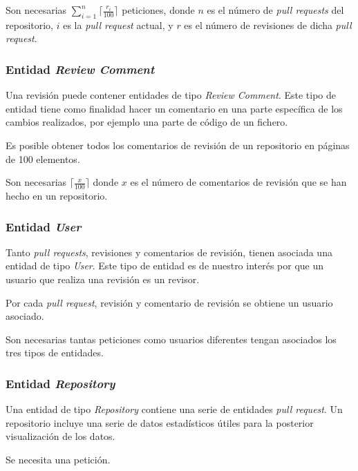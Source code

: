 
Son necesarias $\sum_{i=1}^{n}\lceil\frac{r_{i}}{100}\rceil$ peticiones, donde $n$ es el número de \textit{pull requests} del repositorio, $i$ es la \textit{pull request} actual, y $r$ es el número de revisiones de dicha \textit{pull request}.

\subsubsection{Entidad \textit{Review Comment}}

Una revisión puede contener entidades de tipo \textit{Review Comment}. Este tipo de entidad tiene como finalidad hacer un comentario en una parte específica de los cambios realizados, por ejemplo una parte de código de un fichero.

Es posible obtener todos los comentarios de revisión de un repositorio en páginas de 100 elementos.


Son necesarias $\lceil\frac{x}{100}\rceil$ donde $x$ es el número de comentarios de revisión que se han hecho en un repositorio.

\subsubsection{Entidad \textit{User}}

Tanto \textit{pull requests}, revisiones y comentarios de revisión, tienen asociada una entidad de tipo \textit{User}. Este tipo de entidad es de nuestro interés por que un usuario que realiza una revisión es un revisor.

Por cada \textit{pull request}, revisión y comentario de revisión se obtiene un usuario asociado.

Son necesarias tantas peticiones como usuarios diferentes tengan asociados los tres tipos de entidades.

\subsubsection{Entidad \textit{Repository}}

Una entidad de tipo \textit{Repository} contiene una serie de entidades \textit{pull request}. Un repositorio incluye una serie de datos estadísticos útiles para la posterior visualización de los datos.

Se necesita una petición.

